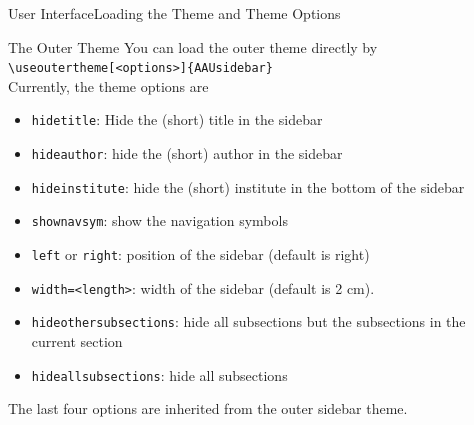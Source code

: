 \documentclass[10pt]{beamer}
\begin{document}
\begin{frame}{User Interface}{Loading the Theme and Theme Options}
  \begin{block}{The Outer Theme}
    You can load the outer theme directly by\\
    {\tt \textbackslash useoutertheme[<options>]\{AAUsidebar\}}\\
    Currently, the theme options are
  \begin{itemize}
    \item {\tt hidetitle}: Hide the (short) title in the sidebar
    \item {\tt hideauthor}: hide the (short) author in the sidebar
    \item {\tt hideinstitute}: hide the (short) institute in the bottom of the sidebar
    \item {\tt shownavsym}: show the navigation symbols
    \item {\tt left} or {\tt right}: position of the sidebar (default is right)
    \item {\tt width=<length>}: width of the sidebar (default is 2 cm).
    \item {\tt hideothersubsections}: hide all subsections but the subsections in the current section
    \item {\tt hideallsubsections}: hide all subsections
  \end{itemize}
  The last four options are inherited from the outer sidebar theme.
  \end{block}
\end{frame}
\end{document}
